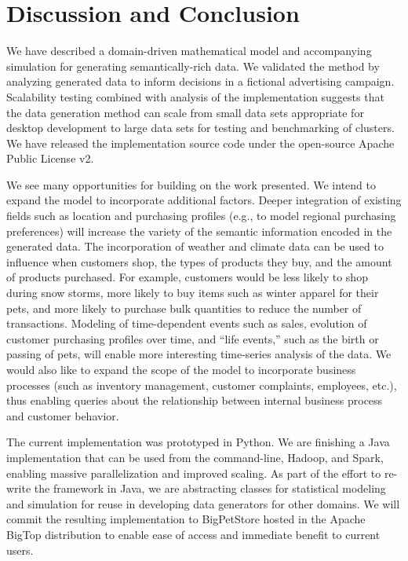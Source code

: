 \section{Discussion and Conclusion}
We have described a domain-driven mathematical model and accompanying simulation for generating semantically-rich data.  We validated the method by analyzing generated data to inform decisions in a fictional advertising campaign. Scalability testing combined with analysis of the implementation suggests that the data generation method can scale from small data sets appropriate for desktop development to large data sets for testing and benchmarking of clusters. We have released the implementation source code under the open-source Apache Public License v2.

We see many opportunities for building on the work presented.  We intend to expand the model to incorporate additional factors.  Deeper integration of existing fields such as location and purchasing profiles (e.g., to model regional purchasing preferences) will increase the variety of the semantic information encoded in the generated data. The incorporation of weather and climate data can be used to influence when customers shop, the types of products they buy, and the amount of products purchased. For example, customers would be less likely to shop during snow storms, more likely to buy items such as winter apparel for their pets, and more likely to purchase bulk quantities to reduce the number of transactions. Modeling of time-dependent events such as sales, evolution of customer purchasing profiles over time, and ``life events,'' such as the birth or passing of pets, will enable more interesting time-series analysis of the data.  We would also like to expand the scope of the model to incorporate business processes (such as inventory management, customer complaints, employees, etc.), thus enabling queries about the relationship between internal business process and customer behavior.

The current implementation was prototyped in Python.  We are finishing a Java implementation that can be used from the command-line, Hadoop, and Spark, enabling massive parallelization and improved scaling.  As part of the effort to re-write the framework in Java, we are abstracting classes for statistical modeling and simulation for reuse in developing data generators for other domains. We will commit the resulting implementation to BigPetStore hosted in the Apache BigTop distribution to enable ease of access and immediate benefit to current users. 
